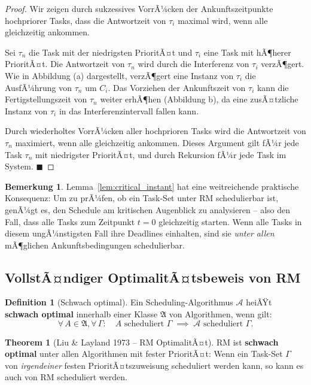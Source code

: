 ﻿\documentclass[a4paper,12pt]{report}
\theoremstyle{definition}
\newtheorem{definition}{Definition}[chapter]
\newtheorem{bemerkung}{Bemerkung}[chapter]
\newtheorem{theorem}{Theorem}[chapter]
\begin{document}
\begin{proof}
	Wir zeigen durch sukzessives VorrÃ¼cken der Ankunftszeitpunkte hochpriorer Tasks,
	dass die Antwortzeit von $\tau_i$ maximal wird, wenn alle gleichzeitig ankommen.

	Sei $\tau_n$ die Task mit der niedrigsten PrioritÃ¤t und $\tau_i$ eine Task mit
	hÃ¶herer PrioritÃ¤t. Die Antwortzeit von $\tau_n$ wird durch die Interferenz von
	$\tau_i$ verzÃ¶gert. Wie in Abbildung (a) dargestellt, verzÃ¶gert eine Instanz von
	$\tau_i$ die AusfÃ¼hrung von $\tau_n$ um $C_i$. Das Vorziehen der Ankunftszeit von
	$\tau_i$ kann die Fertigstellungszeit von $\tau_n$ weiter erhÃ¶hen (Abbildung b),
	da eine zusÃ¤tzliche Instanz von $\tau_i$ in das Interferenzintervall fallen kann.

	Durch wiederholtes VorrÃ¼cken aller hochprioren Tasks wird die Antwortzeit von
	$\tau_n$ maximiert, wenn alle gleichzeitig ankommen. Dieses Argument gilt fÃ¼r
	jede Task $\tau_n$ mit niedrigster PrioritÃ¤t, und durch Rekursion fÃ¼r jede
	Task im System. \hfill$\blacksquare$
\end{proof}

\begin{bemerkung}
	Lemma~\ref{lem:critical_instant} hat eine weitreichende praktische Konsequenz:
	Um zu prÃ¼fen, ob ein Task-Set unter RM schedulierbar ist, genÃ¼gt es, den
	Schedule am kritischen Augenblick zu analysieren -- also den Fall, dass alle
	Tasks zum Zeitpunkt $t = 0$ gleichzeitig starten. Wenn alle Tasks in diesem
	ungÃ¼nstigsten Fall ihre Deadlines einhalten, sind sie \emph{unter allen}
	mÃ¶glichen Ankunftsbedingungen schedulierbar.
\end{bemerkung}

\subsection{VollstÃ¤ndiger OptimalitÃ¤tsbeweis von RM}

\begin{definition}[Schwach optimal]
	\label{def:schwach_optimal}
	Ein Scheduling-Algorithmus $\mathcal{A}$ heiÃŸt \textbf{schwach optimal}
	innerhalb einer Klasse $\mathfrak{A}$ von Algorithmen, wenn gilt:
	\[
		\forall\, A \in \mathfrak{A}, \forall\, \Gamma: \quad
		A \text{ scheduliert } \Gamma \;\implies\; \mathcal{A} \text{ scheduliert } \Gamma.
	\]
\end{definition}

\begin{theorem}[Liu \& Layland 1973 -- RM OptimalitÃ¤t]
	\label{thm:rm_optimal}
	RM ist \textbf{schwach optimal} unter allen Algorithmen mit fester PrioritÃ¤t:
	Wenn ein Task-Set $\Gamma$ von \emph{irgendeiner} festen PrioritÃ¤tszuweisung
	scheduliert werden kann, so kann es auch von RM scheduliert werden.
\end{theorem}
\end{document}
